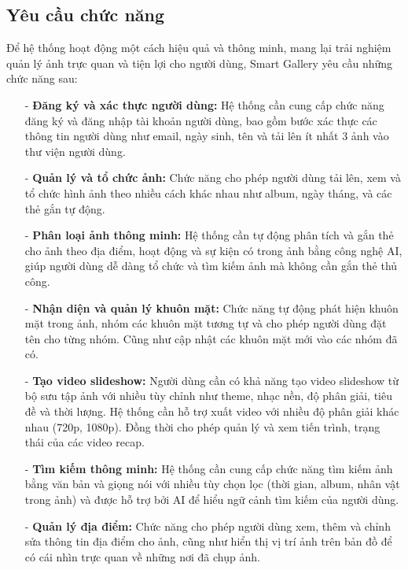 \subsection{Yêu cầu chức năng}

Để hệ thống hoạt động một cách hiệu quả và thông minh, mang lại trải nghiệm quản lý ảnh trực quan và tiện lợi cho người dùng, Smart Gallery yêu cầu những chức năng sau:

\begin{itemize}
    \item[-] \textbf{Đăng ký và xác thực người dùng:} Hệ thống cần cung cấp chức năng đăng ký và đăng nhập tài khoản người dùng, bao gồm bước xác thực các thông tin người dùng như email, ngày sinh, tên và tải lên ít nhất 3 ảnh vào thư viện người dùng. 
    
    \item[-] \textbf{Quản lý và tổ chức ảnh:} Chức năng cho phép người dùng tải lên, xem và tổ chức hình ảnh theo nhiều cách khác nhau như album, ngày tháng, và các thẻ gắn tự động. 
    
    \item[-] \textbf{Phân loại ảnh thông minh:} Hệ thống cần tự động phân tích và gắn thẻ cho ảnh theo địa điểm, hoạt động và sự kiện có trong ảnh bằng công nghệ AI, giúp người dùng dễ dàng tổ chức và tìm kiếm ảnh mà không cần gắn thẻ thủ công.
    
    \item[-] \textbf{Nhận diện và quản lý khuôn mặt:} Chức năng tự động phát hiện khuôn mặt trong ảnh, nhóm các khuôn mặt tương tự và cho phép người dùng đặt tên cho từng nhóm. Cũng như cập nhật các khuôn mặt mới vào các nhóm đã có.
    
    \item[-] \textbf{Tạo video slideshow:} Người dùng cần có khả năng tạo video slideshow từ bộ sưu tập ảnh với nhiều tùy chỉnh như theme, nhạc nền, độ phân giải, tiêu đề và thời lượng. Hệ thống cần hỗ trợ xuất video với nhiều độ phân giải khác nhau (720p, 1080p). Đồng thời cho phép quản lý và xem tiến trình, trạng thái của các video recap.
    
    \item[-] \textbf{Tìm kiếm thông minh:} Hệ thống cần cung cấp chức năng tìm kiếm ảnh bằng văn bản và giọng nói với nhiều tùy chọn lọc (thời gian, album, nhân vật trong ảnh) và được hỗ trợ bởi AI để hiểu ngữ cảnh tìm kiếm của người dùng.
    
    \item[-] \textbf{Quản lý địa điểm:} Chức năng cho phép người dùng xem, thêm và chỉnh sửa thông tin địa điểm cho ảnh, cũng như hiển thị vị trí ảnh trên bản đồ để có cái nhìn trực quan về những nơi đã chụp ảnh.
\end{itemize}